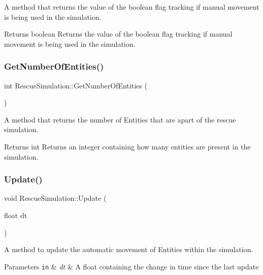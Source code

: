A method that returns the value of the boolean flag tracking if manual movement is being used in the simulation. 

\begin{DoxyReturn}{Returns}
boolean Returns the value of the boolean flag tracking if manual movement is being used in the simulation. 
\end{DoxyReturn}
\mbox{\label{classRescueSimulation_a6769ffcc2fae87c710dad5f7330b01cb}} 
\subsubsection{\texorpdfstring{Get\+Number\+Of\+Entities()}{GetNumberOfEntities()}}
{\footnotesize\ttfamily int Rescue\+Simulation\+::\+Get\+Number\+Of\+Entities (\begin{DoxyParamCaption}{ }\end{DoxyParamCaption})}



A method that returns the number of Entities that are apart of the rescue simulation. 

\begin{DoxyReturn}{Returns}
int Returns an integer containing how many entities are present in the simulation. 
\end{DoxyReturn}
\mbox{\label{classRescueSimulation_a6b9248fa229d3592a68096628ca654a2}} 
\subsubsection{\texorpdfstring{Update()}{Update()}}
{\footnotesize\ttfamily void Rescue\+Simulation\+::\+Update (\begin{DoxyParamCaption}\item[{float}]{dt }\end{DoxyParamCaption})}



A method to update the automatic movement of Entities within the simulation. 


\begin{DoxyParams}[1]{Parameters}
\mbox{\tt in}  & {\em dt} & A float containing the change in time since the last update \\
\hline
\end{DoxyParams}
\mbox{\label{classRescueSimulation_aef3363ae3303a037fbb9faab87ab5a31}} 
